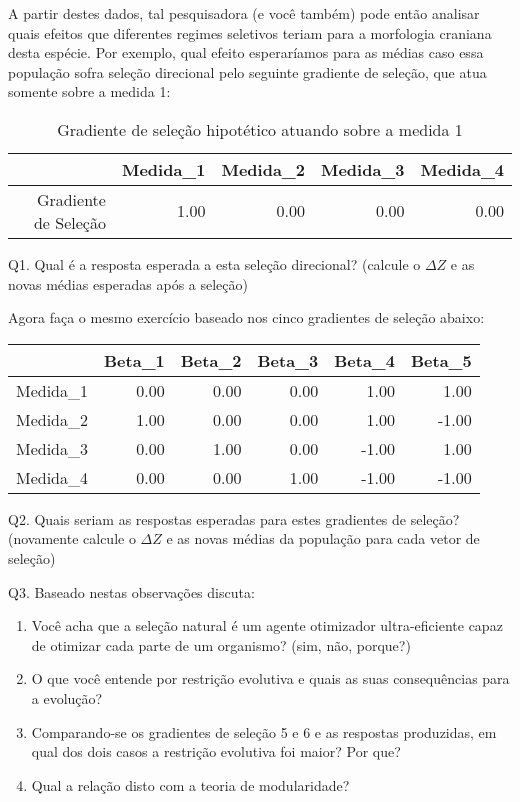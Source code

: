 \documentclass[portuges,]{article}
\begin{document}
\newpage

A partir destes dados, tal pesquisadora (e você também) pode então
analisar quais efeitos que diferentes regimes seletivos teriam para a
morfologia craniana desta espécie. Por exemplo, qual efeito esperaríamos
para as médias caso essa população sofra seleção direcional pelo
seguinte gradiente de seleção, que atua somente sobre a medida 1:

\begin{table}[ht]
\centering
\begin{tabular}{rrrrr}
  \toprule
 & Medida\_1 & Medida\_2 & Medida\_3 & Medida\_4 \\ 
  \midrule
Gradiente de Seleção & 1.00 & 0.00 & 0.00 & 0.00 \\ 
   \bottomrule
\end{tabular}
\caption{Gradiente de seleção hipotético atuando sobre a medida 1} 
\end{table}

Q1. Qual é a resposta esperada a esta seleção direcional? (calcule o
$\Delta Z$ e as novas médias esperadas após a seleção)

Agora faça o mesmo exercício baseado nos cinco gradientes de seleção
abaixo:

\begin{table}[ht]
\centering
\begin{tabular}{rrrrrr}
  \toprule
 & Beta\_1 & Beta\_2 & Beta\_3 & Beta\_4 & Beta\_5 \\ 
  \midrule
Medida\_1 & 0.00 & 0.00 & 0.00 & 1.00 & 1.00 \\ 
  Medida\_2 & 1.00 & 0.00 & 0.00 & 1.00 & -1.00 \\ 
  Medida\_3 & 0.00 & 1.00 & 0.00 & -1.00 & 1.00 \\ 
  Medida\_4 & 0.00 & 0.00 & 1.00 & -1.00 & -1.00 \\ 
   \bottomrule
\end{tabular}
\end{table}

Q2. Quais seriam as respostas esperadas para estes gradientes de
seleção? (novamente calcule o $\Delta Z$ e as novas médias da população
para cada vetor de seleção)

Q3. Baseado nestas observações discuta:

\begin{enumerate}
\def\labelenumi{\alph{enumi})}
\item
  Você acha que a seleção natural é um agente otimizador ultra-eficiente
  capaz de otimizar cada parte de um organismo? (sim, não, porque?)
\item
  O que você entende por restrição evolutiva e quais as suas
  consequências para a evolução?
\item
  Comparando-se os gradientes de seleção 5 e 6 e as respostas produzidas,
  em qual dos dois casos a restrição evolutiva foi maior? Por que?
\item
  Qual a relação disto com a teoria de modularidade?
\end{enumerate}
\end{document}
